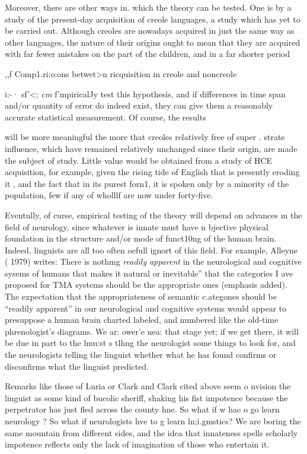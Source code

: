 Moreover, there are other ways in. which the theory can be tested. One is by a study of the present-day acquisition of creole languages, a study which has yet to be carried out. Although creoles are nowadays acquired in just the same way as other languages, the nature of their origins ought to mean that they are acquired with far fewer mistakes on the part of the children, and in a far shorter period

,,f Comp1.ri:o:ons betwet{\textgreater}n ricquisition in creole and noncreole

i:-· sf'{\textless}; \textit{cm} f'mpiricalJy test this hypothesis, and if differences in time span and/or quantity of error do indeed exist, they can give them a reasonably accurate statistical measurement. Of course, the results

will be more meaningful the more that creoles relatively free of super . strate influence, which have remained relatively unchanged since their origin, are made the subject of study. Little value would be obtained from a study of HCE acquisition, for example, given the rising tide of English that is presently eroding it , and the fact that in its purest forn1, it is spoken only by a minority of the population, few if any of wholllf are now under forty-five.


Eventully, of curse, empirical testing of the theory will depend on advances m the field of neurology, since whatever is innate must have n bjective physical foundation in the structure and/or mode of funct10ng of the human brain. Indeed, linguists are all too often oefull ignort of this field. For example, Alleyne ( 1979) writes: There is nothmg \textit{readily} \textit{apparent} in the neurological and cognitive sysems of humans that makes it natural or inevitable'' that the cate\-gories I ave proposed for TMA systems should be the appropriate ones
(emphasis added). The expectation that the appropriateness of semantic c.ategones should be ``readily apparent'' in our neurological and cogni\-tive systems would appear to presuppose a human brain charted labeled, and numbered like the old-time phrenologist's diagrams. We ar: ower'e nea: that stage yet; if we get there, it will be due in part to the lmu:st s tlhng the neurologist some things to look for, and the neurologists telling the linguist whether what he has found confirms or disconfirms what the linguist predicted.

Remarks like those of Luria or Clark and Clark cited above seem o nvision the linguist as some kind of bucolic sheriff, shaking his fist impotence because the perpetrator has just fled across the county hne. So what if w hae o go learn neurology ? So what if neurologists hve to g learn ln;i.gmstics? We are boring the same mountain from different sides, and the idea that innateness spells scholarly impotence
reflects only the lack of imagination of those who entertain it.

